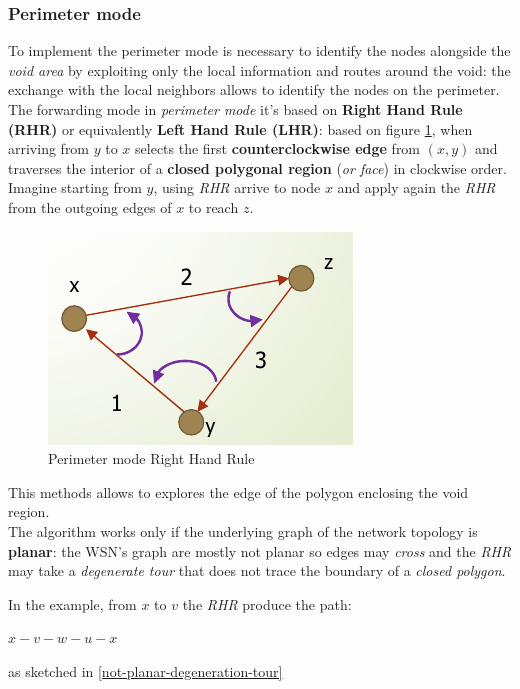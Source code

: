 \documentclass[10pt,a4paper]{report}
\theoremstyle{definition}
\begin{document}
\subsubsection{Perimeter mode}\label{sec:perimeter-mode}
To implement the perimeter mode is necessary to identify the nodes alongside the \textit{void area} by exploiting only the local information and routes around the void: the exchange with the local neighbors allows to identify the nodes on the perimeter.\\
The forwarding mode in \textit{perimeter mode} it's based on \textbf{Right Hand Rule (RHR)} or equivalently \textbf{Left Hand Rule (LHR)}: based on figure \ref{rhr-forwarding}, when arriving from $y$ to $x$ selects the first \textbf{counterclockwise edge} from $(x,y)$ and traverses the interior of a \textbf{closed polygonal region} (\textit{or face}) in clockwise order.
Imagine starting from $y$, using \textit{RHR} arrive to node $x$ and apply again the \textit{RHR} from the outgoing edges of $x$ to reach $z$.
\begin{figure}[h]
	\centering\includegraphics[scale=0.50]{images/Pasted image 20230523151747.png}
	\caption{Perimeter mode Right Hand Rule}
	\label{rhr-forwarding}
\end{figure}

This methods allows to explores the edge of the polygon enclosing the void region.\\
The algorithm works only if the underlying graph of the network topology is \textbf{planar}: the WSN's graph are mostly not planar so edges may \textit{cross} and the \textit{RHR} may take a \textit{degenerate tour} that does not trace the boundary of a \textit{closed polygon}.

In the example, from $x$ to $v$ the \textit{RHR} produce the path:
\begin{center}
	$x-v-w-u-x$
\end{center}
as sketched in \ref{not-planar-degeneration-tour}
\end{document}
